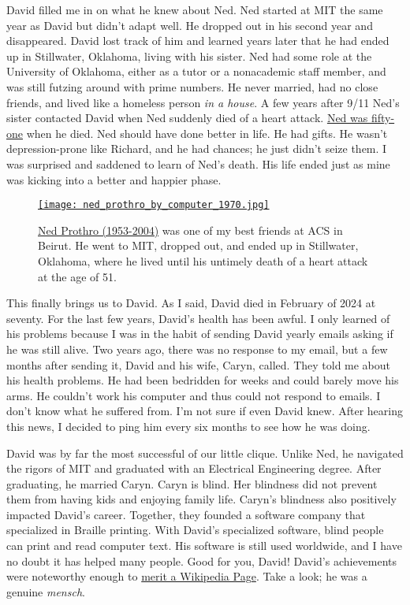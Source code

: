 David filled me in on what he knew about Ned. Ned started at MIT the
same year as David but didn't adapt well. He dropped out in his second
year and disappeared. David lost track of him and learned years later
that he had ended up in Stillwater, Oklahoma, living with his sister.
Ned had some role at the University of Oklahoma, either as a tutor or a
nonacademic staff member, and was still futzing around with prime
numbers. He never married, had no close friends, and lived like a
homeless person \emph{in a house}. A few years after 9/11 Ned's sister contacted David when Ned
suddenly died of a heart attack.
\href{https://www.findagrave.com/memorial/11932084/edwin_terry-prothro}{Ned
was fifty-one} when he died. Ned should have done better in life. He had
gifts. He wasn't depression-prone like Richard, and he had chances; he
just didn't seize them. I was surprised and saddened to learn of Ned's
death. His life ended just as mine was kicking into a better and happier
phase.

\captionsetup[figure]{labelformat=empty}
\begin{SCfigure}
\centering
\href{https://conceptcontrol.smugmug.com/Places/Overseas/Beirut-Lebanon-1960s-1/i-sG6bVnH/A}{\texttt{[image: ned\_prothro\_by\_computer\_1970.jpg]}}
\caption[Ned Prothro (1953-2004)]{\href{https://www.findagrave.com/memorial/11932084/edwin_terry-prothro}{Ned
Prothro (1953-2004)} was one of my best friends at ACS in Beirut. He
went to MIT, dropped out, and ended up in Stillwater, Oklahoma, where he
lived until his untimely death of a heart attack at the age of 51.}
\label{fig:8196x2}
\end{SCfigure}
 

This finally brings us to David. As I said, David died in February of
2024 at seventy. For the last few years, David's health has been awful.
I only learned of his problems because I was in the habit of sending
David yearly emails asking if he was still alive. Two years ago, there
was no response to my email, but a few months after sending it, David
and his wife, Caryn, called. They told me about his health problems. He
had been bedridden for weeks and could barely move his arms. He couldn't
work his computer and thus could not respond to emails. I don't know
what he suffered from. I'm not sure if even David knew. After hearing
this news, I decided to ping him every six months to see how he was
doing.

David was by far the most successful of our little clique. Unlike Ned,
he navigated the rigors of MIT and graduated with an Electrical
Engineering degree. After graduating, he married Caryn. Caryn is blind.
Her blindness did not prevent them from having kids and enjoying family
life. Caryn's blindness also positively impacted David's career.
Together, they founded a software company that specialized in Braille
printing. With David's specialized software, blind people can print and
read computer text. His software is still used worldwide, and I have no
doubt it has helped many people. Good for you, David! David's
achievements were noteworthy enough to
\href{https://en.wikipedia.org/wiki/David_Holladay}{merit a Wikipedia
Page}. Take a look; he was a genuine \emph{mensch}.

